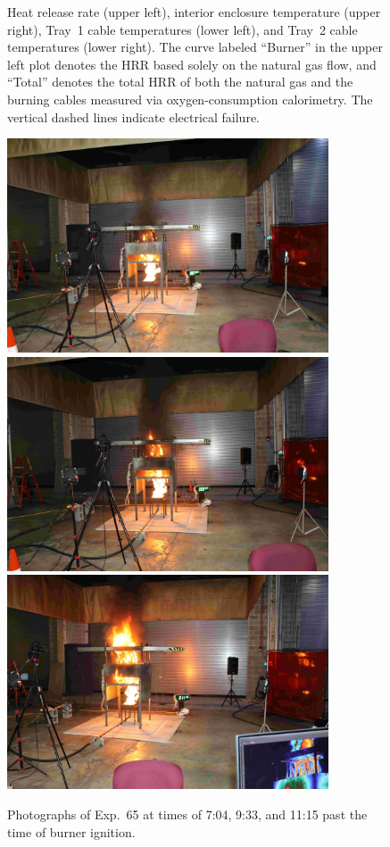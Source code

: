 \begin{figure}[H]
\caption[HRR and temperatures of Exp.~65]{Heat release rate (upper left), interior enclosure temperature (upper right), Tray~1 cable temperatures (lower left), and Tray~2 cable temperatures (lower right). The curve labeled ``Burner'' in the upper left plot denotes the HRR based solely on the natural gas flow, and ``Total'' denotes the total HRR of both the natural gas and the burning cables measured via oxygen-consumption calorimetry. The vertical dashed lines indicate electrical failure.}
\label{fig:Test_65}
\end{figure}

\begin{figure}[p]
\centering
\includegraphics[height=2.50in]{../FIGURES/Test_65_Photo_1} \\ \vspace{0.1in}
\includegraphics[height=2.50in]{../FIGURES/Test_65_Photo_2} \\ \vspace{0.1in}
\includegraphics[height=2.50in]{../FIGURES/Test_65_Photo_3}
\caption[Photographs of Exp.~65]{Photographs of Exp.~65 at times of 7:04, 9:33, and 11:15 past the time of burner ignition.}
\label{fig:Test_65_photos}
\end{figure}



